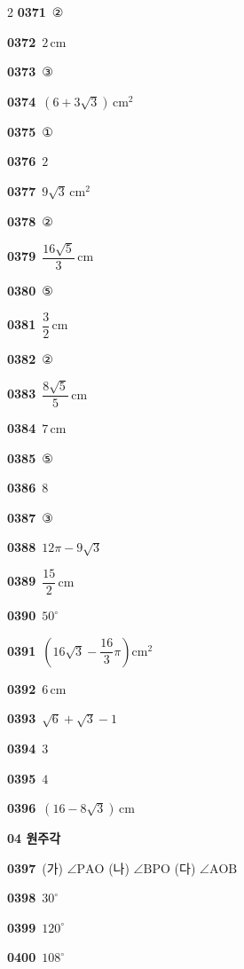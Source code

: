 \documentclass[10pt,a4paper]{article}
\newcommand{\pt}[1]{\mathrm{#1}}
\begin{document}
\begin{multicols}{2}
\noindent\textbf{0371}\ ②\par
\noindent\textbf{0372}\ $2\,\mathrm{cm}$\par
\noindent\textbf{0373}\ ③\par
\noindent\textbf{0374}\ $(6+3\sqrt{3})\,\mathrm{cm}^2$\par
\noindent\textbf{0375}\ ①\par
\noindent\textbf{0376}\ $2$\par
\noindent\textbf{0377}\ $9\sqrt{3}\,\mathrm{cm}^2$\par
\noindent\textbf{0378}\ ②\par
\noindent\textbf{0379}\ $\dfrac{16\sqrt{5}}{3}\,\mathrm{cm}$\par
\noindent\textbf{0380}\ ⑤\par
\noindent\textbf{0381}\ $\dfrac{3}{2}\,\mathrm{cm}$\par
\noindent\textbf{0382}\ ②\par
\noindent\textbf{0383}\ $\dfrac{8\sqrt{5}}{5}\,\mathrm{cm}$\par
\noindent\textbf{0384}\ $7\,\mathrm{cm}$\par
\noindent\textbf{0385}\ ⑤\par
\noindent\textbf{0386}\ $8$\par
\noindent\textbf{0387}\ ③\par
\noindent\textbf{0388}\ $12\pi-9\sqrt{3}$\par
\noindent\textbf{0389}\ $\dfrac{15}{2}\,\mathrm{cm}$\par
\noindent\textbf{0390}\ $50^\circ$\par
\noindent\textbf{0391}\ $\left(16\sqrt{3}-\dfrac{16}{3}\pi\right)\mathrm{cm}^2$\par
\noindent\textbf{0392}\ $6\,\mathrm{cm}$\par
\noindent\textbf{0393}\ $\sqrt{6}+\sqrt{3}-1$\par
\noindent\textbf{0394}\ $3$\par
\noindent\textbf{0395}\ $4$\par
\noindent\textbf{0396}\ $(16-8\sqrt{3})\,\mathrm{cm}$\par
\noindent\textbf{04 원주각}\par\smallskip
\noindent\textbf{0397}\ (가) $\angle\pt{PAO}$ (나) $\angle\pt{BPO}$ (다) $\angle\pt{AOB}$\par
\noindent\textbf{0398}\ $30^\circ$\par
\noindent\textbf{0399}\ $120^\circ$\par
\noindent\textbf{0400}\ $108^\circ$\par

\end{multicols}
\end{document}

